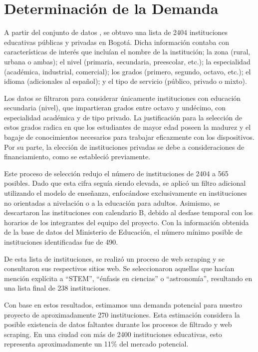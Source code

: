 \section{Determinación de la Demanda}%
\label{sec:Determinación de la Demanda}

A partir del conjunto de datos \cite{Nacional2016}, se obtuvo una lista de 2404
instituciones educativas públicas y privadas en Bogotá.
Dicha información contaba con características de interés que incluían el nombre
de la institución; la zona (rural, urbana o ambas);
el nivel (primaria, secundaria, preescolar, etc.); la especialidad
(académica, industrial, comercial); los grados (primero, segundo, octavo,
etc.); el idioma (adicionales al español); y el tipo de servicio (público,
privado o mixto).

Los datos se filtraron para considerar únicamente instituciones con educación
secundaria (nivel), que impartieran grados entre octavo y undécimo, con
especialidad académica y de tipo privado.
La justificación para la selección de estos grados radica en que los
estudiantes de mayor edad poseen la madurez y el bagaje de conocimientos
necesarios para trabajar eficazmente con los dispositivos.
Por su parte, la elección de instituciones privadas se debe a consideraciones
de financiamiento, como se estableció previamente.

Este proceso de selección redujo el número de instituciones de 2404 a 565
posibles.
Dado que esta cifra seguía siendo elevada, se aplicó un filtro adicional
utilizando el modelo de enseñanza, enfocándose exclusivamente en instituciones
no orientadas a nivelación o a la educación para adultos.
Asimismo, se descartaron las instituciones con calendario B, debido al desfase
temporal con los horarios de los integrantes del equipo del proyecto.
Con la información obtenida de la base de datos del Ministerio de Educación,
el número mínimo posible de instituciones identificadas fue de 490.

De esta lista de instituciones, se realizó un proceso de web scraping y se
consultaron sus respectivos sitios web.
Se seleccionaron aquellas que hacían mención explícita a ``STEM'', ``énfasis en
ciencias'' o ``astronomía'', resultando en una lista final de 238 instituciones.

Con base en estos resultados, estimamos una demanda potencial para nuestro
proyecto de aproximadamente 270 instituciones.
Esta estimación considera la posible existencia de datos faltantes durante los
procesos de filtrado y web scraping.
En una ciudad con más de 2400 instituciones educativas, esto representa
aproximadamente un 11\% del mercado potencial.
